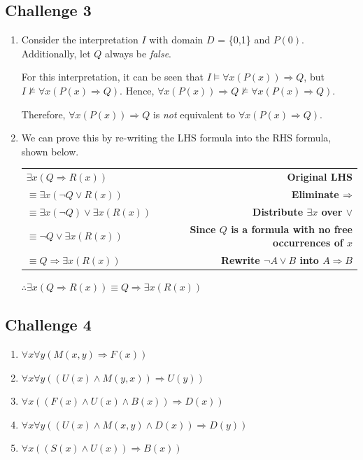\documentclass[12pt]{article}
\newcommand{\impl}{\mathbin{\Rightarrow}}
\begin{document}
\subsection*{Challenge 3}
\begin{enumerate}
  \item
Consider the interpretation $I$ with domain $D$ = \{0,1\} and $P(0)$. Additionally, 
let $Q$ always be \emph{false}.

\bigskip
\noindent
For this interpretation, it can be seen that $I \vDash \forall x
(P(x)) \impl Q$, but $I \nvDash \forall x(P(x) \impl Q)$.
Hence, $\forall x(P(x)) \impl Q \nvDash \forall x(P(x) \impl Q)$.

\bigskip
\noindent
Therefore, $\forall x (P(x)) \impl Q$ is \emph{not} equivalent to
$\forall x(P(x) \impl Q)$.

\bigskip
\item We can prove this by re-writing the LHS formula into the RHS formula, shown below.

\begin{center}
\begin{tabular}{l r}
$\exists x(Q \impl R(x))$ & \textbf{Original LHS}\\
$\equiv \exists x(\neg Q \lor R(x))$ & \textbf{Eliminate $\impl$}\\
$\equiv \exists x(\neg Q) \lor \exists x(R(x))$ & \textbf{Distribute $\exists x$ over $\lor$}\\
$\equiv \neg Q \lor \exists x(R(x))$ & \textbf{Since $Q$ is a formula with no free occurrences of $x$}\\
$\equiv Q \impl \exists x(R(x))$ & \textbf{Rewrite $\neg A \lor B$ into $A \impl B$}\\
\end{tabular}
\end{center}

$\therefore \exists x(Q \impl R(x)) \equiv Q \impl \exists x(R(x))$ 

\end{enumerate}


\subsection*{Challenge 4}
\begin{enumerate}
  \item $\forall x \forall y(M(x,y) \impl F(x))$
  \item $\forall x \forall y((U(x) \land M(y,x)) \impl U(y))$
  \item $\forall x((F(x) \land U(x) \land B(x)) \impl D(x))$
  \item $\forall x \forall y((U(x) \land M(x,y) \land D(x)) \impl D(y))$
  \item $\forall x((S(x) \land U(x)) \impl B(x))$
\end{enumerate}
\end{document}
